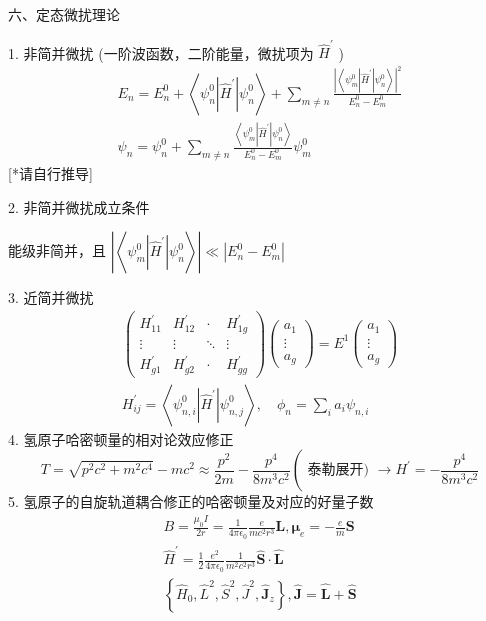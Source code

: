 \documentclass[../../note.tex]{subfiles}
\begin{document}
六、定态微扰理论

1. 非简并微扰 (一阶波函数，二阶能量，微扰项为 $\hat{H}^{\prime}$ )
$$
\begin{array}{r}
E_n=E_n^0+\left\langle\psi_n^0\left|\hat{H}^{\prime}\right| \psi_n^0\right\rangle+\mathop{\sum}\limits_{m \neq n} \frac{\left|\left\langle\psi_m^0\left|\hat{H}^{\prime}\right| \psi_n^0\right\rangle\right|^2}{E_n^0-E_m^0} \\
\psi_n=\psi_n^0+\mathop{\sum}\limits_{m \neq n} \frac{\left\langle\psi_m^0\left|\hat{H}^{\prime}\right| \psi_n^0\right\rangle}{E_n^0-E_m^0} \psi_m^0
\end{array}
$$
[*请自行推导]

2. 非简并微扰成立条件

能级非简并，且 $\left|\left\langle\psi_m^0\left|\hat{H}^{\prime}\right| \psi_n^0\right\rangle\right| \ll\left|E_n^0-E_m^0\right|$

3. 近简并微扰
$$
\begin{gathered}
\left(\begin{array}{cccc}
H_{11}^{\prime} & H_{12}^{\prime} & \cdot & H_{1 g}^{\prime} \\
\vdots & \vdots & \ddots & \vdots \\
H_{g 1}^{\prime} & H_{g 2}^{\prime} & \cdot & H_{g g}^{\prime}
\end{array}\right)\left(\begin{array}{c}
a_1 \\
\vdots \\
a_g
\end{array}\right)=E^1\left(\begin{array}{c}
a_1 \\
\vdots \\
a_g
\end{array}\right) \\
H_{i j}^{\prime}=\left\langle\psi_{n, i}^0\left|\hat{H}^{\prime}\right| \psi_{n, j}^0\right\rangle, \quad \phi_n=\sum_i a_i \psi_{n, i}
\end{gathered}
$$
4. 氢原子哈密顿量的相对论效应修正
$$
T=\sqrt{p^2 c^2+m^2 c^4}-m c^2 \approx \frac{p^2}{2 m}-\frac{p^4}{8 m^3 c^2}\left(\text { 泰勒展开) } \rightarrow H^{\prime}=-\frac{p^4}{8 m^3 c^2}\right.
$$
5. 氢原子的自旋轨道耦合修正的哈密顿量及对应的好量子数
$$
\begin{array}{r}
B=\frac{\mu_0 I}{2 r}=\frac{1}{4 \pi \epsilon_0} \frac{e}{m c^2 r^3} \boldsymbol{L}, \boldsymbol{\mu}_e=-\frac{e}{m} \boldsymbol{S} \\
\hat{H}^{\prime}=\frac{1}{2} \frac{e^2}{4 \pi \epsilon_0} \frac{1}{m^2 c^2 r^3} \hat{\boldsymbol{S}} \cdot \hat{\boldsymbol{L}} \\
\left\{\hat{H}_0, \hat{L}^2, \hat{S}^2, \hat{J}^2, \hat{\boldsymbol{J}}_z\right\}, \hat{\boldsymbol{J}}=\hat{\boldsymbol{L}}+\hat{\boldsymbol{S}}
\end{array}
$$
\end{document}
